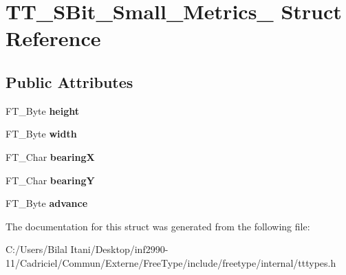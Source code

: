 \hypertarget{struct_t_t___s_bit___small___metrics__}{}\section{T\+T\+\_\+\+S\+Bit\+\_\+\+Small\+\_\+\+Metrics\+\_\+ Struct Reference}
\label{struct_t_t___s_bit___small___metrics__}
\subsection*{Public Attributes}
\begin{DoxyCompactItemize}
\item 
F\+T\+\_\+\+Byte {\bfseries height}\hypertarget{struct_t_t___s_bit___small___metrics___aecc44b5e504d5ce27521505ed53420c8}{}\label{struct_t_t___s_bit___small___metrics___aecc44b5e504d5ce27521505ed53420c8}

\item 
F\+T\+\_\+\+Byte {\bfseries width}\hypertarget{struct_t_t___s_bit___small___metrics___ad2401ae208b1663d0085ca06a04885fe}{}\label{struct_t_t___s_bit___small___metrics___ad2401ae208b1663d0085ca06a04885fe}

\item 
F\+T\+\_\+\+Char {\bfseries bearingX}\hypertarget{struct_t_t___s_bit___small___metrics___a4361ae83a66706852c0c7d4c4ddff9c2}{}\label{struct_t_t___s_bit___small___metrics___a4361ae83a66706852c0c7d4c4ddff9c2}

\item 
F\+T\+\_\+\+Char {\bfseries bearingY}\hypertarget{struct_t_t___s_bit___small___metrics___aba8cbfd6203f4083b8fb305f88d6d1fc}{}\label{struct_t_t___s_bit___small___metrics___aba8cbfd6203f4083b8fb305f88d6d1fc}

\item 
F\+T\+\_\+\+Byte {\bfseries advance}\hypertarget{struct_t_t___s_bit___small___metrics___a056c5ea71ec3339ca9b7356ea7c90e37}{}\label{struct_t_t___s_bit___small___metrics___a056c5ea71ec3339ca9b7356ea7c90e37}

\end{DoxyCompactItemize}


The documentation for this struct was generated from the following file\+:\begin{DoxyCompactItemize}
\item 
C\+:/\+Users/\+Bilal Itani/\+Desktop/inf2990-\/11/\+Cadriciel/\+Commun/\+Externe/\+Free\+Type/include/freetype/internal/tttypes.\+h\end{DoxyCompactItemize}
